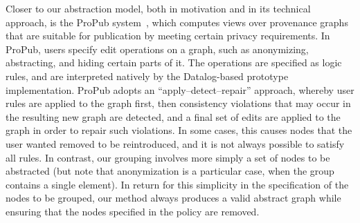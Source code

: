 %

Closer to our abstraction model, both in motivation and in its technical approach, is the ProPub system~\citep{springerlink:10.1007/978-3-642-22351-8_13}, which computes views over provenance graphs that are suitable for publication by meeting  certain privacy requirements. In ProPub, users specify edit operations on a graph, such as anonymizing, abstracting, and hiding certain parts of it.
%
The operations are specified as logic rules, and are interpreted natively by the Datalog-based prototype implementation. ProPub adopts an ``apply--detect--repair'' approach, whereby user rules are applied to the graph first, then consistency violations that may occur in the resulting new graph are detected, and a final set of edits are applied to the graph in order to repair such violations. In some cases, this causes nodes that the user wanted removed to be reintroduced, and it is not always possible to satisfy all rules. 
%
In contrast, our grouping involves more simply a set of nodes to be abstracted (but note that anonymization is a particular case, when the group contains a single element). In return for this simplicity in the specification of the nodes to be grouped, our method always produces a valid abstract graph while ensuring that the nodes specified in the policy are removed. 

